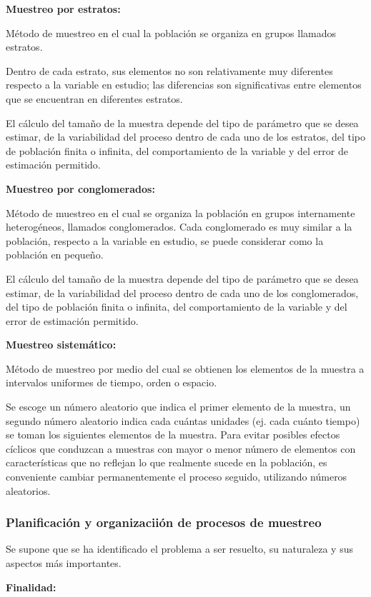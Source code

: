 \documentclass[a5paper,doc,10pt,noapacite]{apa6}
\newcommand{\neodefi}[1]{%
	\vspace{1\baselineskip}
	\textbf{\small#1} \newline
}
\begin{document}
{{\neodefi{Muestreo por estratos:}
	Método de muestreo en el cual la población se organiza en grupos llamados estratos. 
	
	Dentro de cada estrato, sus elementos no son relativamente muy diferentes respecto a la variable en estudio; las diferencias son significativas entre elementos que se encuentran en diferentes estratos.
	
	El cálculo del tamaño de la muestra depende del tipo de parámetro que se desea estimar, de la variabilidad del proceso dentro de cada uno de los estratos, del tipo de población finita o infinita, del comportamiento de la variable y del error de estimación permitido. 
	
\neodefi{Muestreo por conglomerados:}
	Método de muestreo en el cual se organiza la población en grupos internamente heterogéneos, llamados conglomerados. Cada conglomerado es muy similar a la  población, respecto a la variable en estudio, se puede considerar como la población en pequeño.
	
	El cálculo del tamaño de la muestra depende del tipo de parámetro que se desea estimar, de la variabilidad del proceso dentro de cada uno de los conglomerados, del tipo de población finita o infinita, del comportamiento de la variable y del error de estimación permitido.
	
\neodefi{Muestreo sistemático:}
	Método de muestreo por medio del cual se obtienen los elementos de la muestra a intervalos uniformes de tiempo, orden o espacio.
	
	Se escoge un número aleatorio que indica el primer elemento de la muestra, un segundo número aleatorio indica cada cuántas unidades (ej. cada cuánto tiempo) se toman los siguientes elementos de la muestra. Para evitar posibles efectos cíclicos que conduzcan a muestras con mayor o menor número de elementos con características que no reflejan lo que realmente sucede en la población, es conveniente cambiar permanentemente el proceso seguido, utilizando números aleatorios.
	



%
\subsubsection{Planificación y organizaciión de procesos de muestreo}
	
Se supone que se ha identificado el problema a ser resuelto, su naturaleza y sus aspectos más importantes.

\neodefi{Finalidad:}

}}
\end{document}
